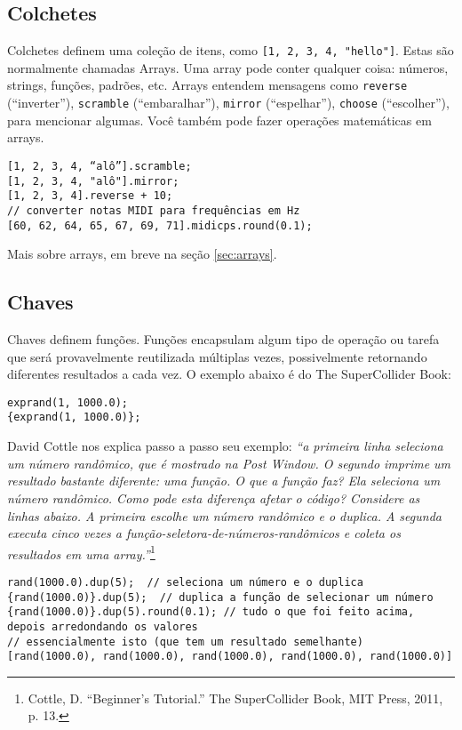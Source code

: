 \subsection{Colchetes}

Colchetes definem uma coleção de itens, como \texttt{[1, 2, 3, 4, "hello"]}. Estas são normalmente chamadas Arrays. Uma array pode conter qualquer coisa: números, strings, funções, padrões, etc. Arrays entendem mensagens como \texttt{reverse} (“inverter”), \texttt{scramble} (“embaralhar”), \texttt{mirror} (“espelhar”), \texttt{choose} (“escolher”), para mencionar algumas. Você também pode fazer operações matemáticas em arrays.


\begin{lstlisting}[style=SuperCollider-IDE, basicstyle=\scttfamily\footnotesize]
[1, 2, 3, 4, “alô”].scramble;
[1, 2, 3, 4, "alô"].mirror;
[1, 2, 3, 4].reverse + 10;
// converter notas MIDI para frequências em Hz 
[60, 62, 64, 65, 67, 69, 71].midicps.round(0.1);
\end{lstlisting}

Mais sobre arrays, em breve na seção \ref{sec:arrays}.

\subsection{Chaves}

Chaves definem funções. Funções encapsulam algum tipo de operação ou tarefa que será provavelmente reutilizada múltiplas vezes, possivelmente retornando diferentes resultados a cada vez. O exemplo abaixo é do The SuperCollider Book:

\begin{lstlisting}[style=SuperCollider-IDE, basicstyle=\scttfamily\footnotesize]
exprand(1, 1000.0);
{exprand(1, 1000.0)};
\end{lstlisting}

David Cottle nos explica passo a passo seu exemplo: \textit{“a primeira linha seleciona um número randômico, que é mostrado na Post Window. O segundo imprime um resultado bastante diferente: uma função. O que a função faz? Ela seleciona um número randômico. Como pode esta diferença afetar o código? Considere as linhas abaixo. A primeira escolhe um número randômico e o duplica. A segunda executa  cinco vezes a função-seletora-de-números-randômicos e coleta os resultados em uma array.”}\footnote{Cottle, D. ``Beginner's Tutorial.'' The SuperCollider Book, MIT Press, 2011, p. 13.}

\begin{lstlisting}[style=SuperCollider-IDE, basicstyle=\scttfamily\footnotesize]
rand(1000.0).dup(5);  // seleciona um número e o duplica
{rand(1000.0)}.dup(5);  // duplica a função de selecionar um número {rand(1000.0)}.dup(5).round(0.1); // tudo o que foi feito acima, depois arredondando os valores
// essencialmente isto (que tem um resultado semelhante)
[rand(1000.0), rand(1000.0), rand(1000.0), rand(1000.0), rand(1000.0)]
\end{lstlisting}
 
